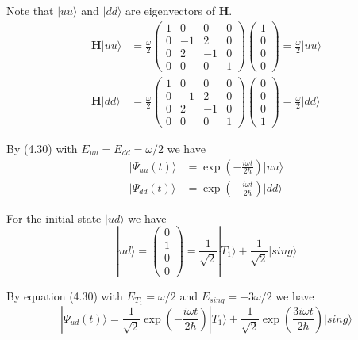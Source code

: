 \documentclass[12pt]{article}
\begin{document}
Note that $|uu\rangle$ and $|dd\rangle$ are eigenvectors of $\mathbf H$.
\begin{align*}
\mathbf H|uu\rangle&=\frac{\omega}{2}
\begin{pmatrix}
1&0&0&0
\\
0&-1&2&0
\\
0&2&-1&0
\\
0&0&0&1
\end{pmatrix}
\begin{pmatrix}1\\0\\0\\0\end{pmatrix}
=\frac{\omega}{2}|uu\rangle
\\[1ex]
\mathbf H|dd\rangle&=\frac{\omega}{2}
\begin{pmatrix}
1&0&0&0
\\
0&-1&2&0
\\
0&2&-1&0
\\
0&0&0&1
\end{pmatrix}
\begin{pmatrix}0\\0\\0\\1\end{pmatrix}
=\frac{\omega}{2}|dd\rangle
\end{align*}

By (4.30) with $E_{uu}=E_{dd}=\omega/2$ we have
\begin{align*}
|\Psi_{uu}(t)\rangle&=\exp\left(-\frac{i\omega t}{2\hbar}\right)|uu\rangle
\\
|\Psi_{dd}(t)\rangle&=\exp\left(-\frac{i\omega t}{2\hbar}\right)|dd\rangle
\end{align*}

For the initial state $|ud\rangle$ we have
\begin{equation*}
|ud\rangle=\begin{pmatrix}0\\1\\0\\0\end{pmatrix}
=\frac{1}{\sqrt2}|T_1\rangle+\frac{1}{\sqrt2}|sing\rangle
\end{equation*}

By equation (4.30) with $E_{T_1}=\omega/2$ and $E_{sing}=-3\omega/2$ we have
\begin{equation*}
|\Psi_{ud}(t)\rangle
=\frac{1}{\sqrt2}\exp\left(-\frac{i\omega t}{2\hbar}\right)|T_1\rangle
+\frac{1}{\sqrt2}\exp\left(\frac{3i\omega t}{2\hbar}\right)|sing\rangle
\end{equation*}
\end{document}
